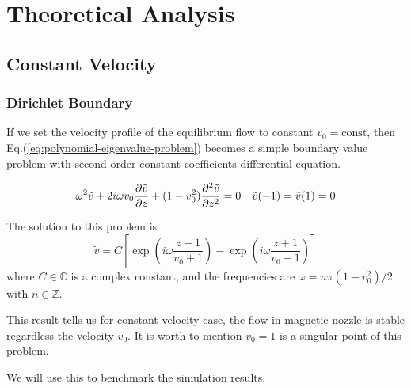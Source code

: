 \chapter{Theoretical Analysis} \label{chap:theoretical-analysis}
\section{Constant Velocity}
\subsection{Dirichlet Boundary}
If we set the velocity profile of the equilibrium flow to constant $v_0=\text{const}$, then Eq.(\ref{eq:polynomial-eigenvalue-problem}) becomes a simple boundary value problem with second order constant coefficients differential equation.

\begin{equation} \label{eq:constant-v-problem-dirichlet}
    \omega^2\tilde{v} + 2i\omega v_0\pdv{\tilde{v}}{z} + (1-v_0^2)\pdv[2]{\tilde{v}}{z} = 0
    \quad
    \tilde{v}(-1) = \tilde{v}(1) = 0
\end{equation}

The solution to this problem is
\begin{equation} \label{eq:constant-v-solution-dirichlet}
    \tilde{v} = C\left[ \exp\left(i\omega\frac{z+1}{v_0+1}\right) - \exp\left(i\omega\frac{z+1}{v_0-1}\right) \right]
\end{equation}
where $C\in\mathbb{C}$ is a complex constant, and the frequencies are $\omega=n\pi(1-v_0^2)/2$ with $n\in\mathbb{Z}$. 

This result tells us for constant velocity case, the flow in magnetic nozzle is stable regardless the velocity $v_0$. It is worth to mention $v_0=1$ is a singular point of this problem.

We will use this to benchmark the simulation results. 

